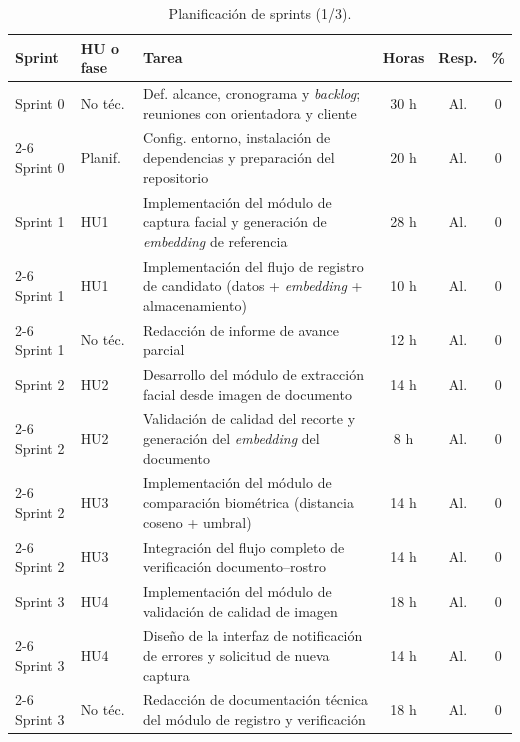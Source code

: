 \documentclass[
  11pt, %
]{charter}
\begin{document}
\begin{table}[htpb]
  \centering
  \caption{Planificación de sprints (1/3).}
  \begin{tabularx}{\linewidth}{@{}|l|X|X|c|c|c|@{}}
    \hline
    \rowcolor[HTML]{C0C0C0}
    Sprint & HU o fase & Tarea & Horas & Resp. & \% \\ \hline

    Sprint 0 & No téc. & Def. alcance, cronograma y \textit{backlog}; reuniones con orientadora y cliente & 30 h & Al. & 0 \\ \cline{2-6}
    Sprint 0 & Planif. & Config. entorno, instalación de dependencias y preparación del repositorio & 20 h & Al. & 0 \\ \hline

    Sprint 1 & HU1 & Implementación del módulo de captura facial y generación de \textit{embedding} de referencia & 28 h & Al. & 0 \\ \cline{2-6}
    Sprint 1 & HU1 & Implementación del flujo de registro de candidato (datos + \textit{embedding} + almacenamiento) & 10 h & Al. & 0 \\ \cline{2-6}
    Sprint 1 & No téc. & Redacción de informe de avance parcial & 12 h & Al. & 0 \\ \hline

    Sprint 2 & HU2 & Desarrollo del módulo de extracción facial desde imagen de documento & 14 h & Al. & 0 \\ \cline{2-6}
    Sprint 2 & HU2 & Validación de calidad del recorte y generación del \textit{embedding} del documento & 8 h & Al. & 0 \\ \cline{2-6}
    Sprint 2 & HU3 & Implementación del módulo de comparación biométrica (distancia coseno + umbral) & 14 h & Al. & 0 \\ \cline{2-6}
    Sprint 2 & HU3 & Integración del flujo completo de verificación documento--rostro & 14 h & Al. & 0 \\ \hline

    Sprint 3 & HU4 & Implementación del módulo de validación de calidad de imagen & 18 h & Al. & 0 \\ \cline{2-6}
    Sprint 3 & HU4 & Diseño de la interfaz de notificación de errores y solicitud de nueva captura & 14 h & Al. & 0 \\ \cline{2-6}
    Sprint 3 & No téc. & Redacción de documentación técnica del módulo de registro y verificación & 18 h & Al. & 0 \\ \hline

  \end{tabularx}
\end{table}
\end{document}
